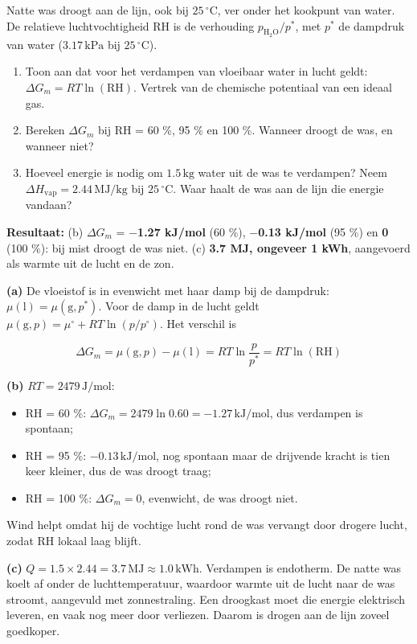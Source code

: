 \begin{oefening}
Natte was droogt aan de lijn, ook bij \(25\,^\circ\mathrm{C}\), ver onder het kookpunt van water. De relatieve luchtvochtigheid RH is de verhouding \(p_{\mathrm{H_2O}}/p^*\), met \(p^*\) de dampdruk van water (\(3.17\,\mathrm{kPa}\) bij \(25\,^\circ\mathrm{C}\)).

\begin{enumerate}
\item[(a)]
  Toon aan dat voor het verdampen van vloeibaar water in lucht geldt: \(\Delta G_m = RT\ln(\text{RH})\). Vertrek van de chemische potentiaal van een ideaal gas.
\item[(b)]
  Bereken \(\Delta G_m\) bij RH = 60 \%, 95 \% en 100 \%. Wanneer droogt de was, en wanneer niet?
\item[(c)]
  Hoeveel energie is nodig om \(1.5\,\mathrm{kg}\) water uit de was te verdampen? Neem \(\Delta H_{\text{vap}} = 2.44\,\mathrm{MJ/kg}\) bij \(25\,^\circ\mathrm{C}\). Waar haalt de was aan de lijn die energie vandaan?
\end{enumerate}
\end{oefening}
\begin{oplossing}
\textbf{Resultaat:} (b) \(\Delta G_m\) = \textbf{\ensuremath{-}1.27 kJ/mol} (60 \%), \textbf{\ensuremath{-}0.13 kJ/mol} (95 \%) en \textbf{0} (100 \%): bij mist droogt de was niet. (c) \textbf{3.7 MJ, ongeveer 1 kWh}, aangevoerd als warmte uit de lucht en de zon.

\textbf{(a)} De vloeistof is in evenwicht met haar damp bij de dampdruk: \(\mu(\mathrm{l}) = \mu(\mathrm{g}, p^*)\). Voor de damp in de lucht geldt \(\mu(\mathrm{g}, p) = \mu^\circ + RT\ln(p/p^\circ)\). Het verschil is

\[
\Delta G_m = \mu(\mathrm{g}, p) - \mu(\mathrm{l}) = RT\ln\frac{p}{p^*} = RT\ln(\text{RH})
\]

\textbf{(b)} \(RT = 2479\,\mathrm{J/mol}\):

\begin{itemize}
\item
  RH = 60 \%: \(\Delta G_m = 2479\ln 0.60 = -1.27\,\mathrm{kJ/mol}\), dus verdampen is spontaan;
\item
  RH = 95 \%: \(-0.13\,\mathrm{kJ/mol}\), nog spontaan maar de drijvende kracht is tien keer kleiner, dus de was droogt traag;
\item
  RH = 100 \%: \(\Delta G_m = 0\), evenwicht, de was droogt niet.
\end{itemize}

Wind helpt omdat hij de vochtige lucht rond de was vervangt door drogere lucht, zodat RH lokaal laag blijft.

\textbf{(c)} \(Q = 1.5 \times 2.44 = 3.7\,\mathrm{MJ} \approx 1.0\,\mathrm{kWh}\). Verdampen is endotherm. De natte was koelt af onder de luchttemperatuur, waardoor warmte uit de lucht naar de was stroomt, aangevuld met zonnestraling. Een droogkast moet die energie elektrisch leveren, en vaak nog meer door verliezen. Daarom is drogen aan de lijn zoveel goedkoper.
\end{oplossing}


